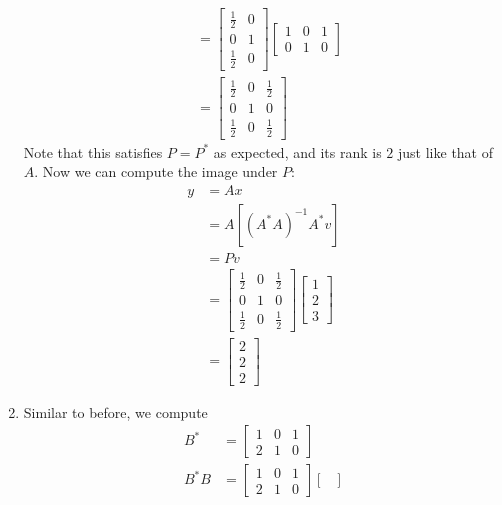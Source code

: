 \documentclass[12pt]{article}
\newenvironment{sol}[1][Solution]{\begin{trivlist}
		\item[\hskip \labelsep {\bfseries #1:}]}{\end{trivlist}}
\begin{document}
\begin{sol}
\begin{enumerate}[label=(\alph*)]
\begin{align*}
			&=\begin{bmatrix}
				\frac{1}{2} & 0\\
				0 & 1\\
				\frac{1}{2} & 0
			\end{bmatrix}
			\begin{bmatrix}
				1 & 0 & 1\\
				0 & 1 & 0
			\end{bmatrix}\\
			&=\begin{bmatrix}
				\frac{1}{2} & 0 & \frac{1}{2}\\
				0 & 1 & 0\\
				\frac{1}{2} & 0 & \frac{1}{2}
			\end{bmatrix}
		\end{align*}
		Note that this satisfies $P=P^*$ as expected, and its rank is $2$ just like that of $A$.
		Now we can compute the image under $P$:
		\begin{align*}
			y&=Ax\\
			&=A[(A^*A)^{-1}A^*v]\\
			&=Pv\\
			&=\begin{bmatrix}
				\frac{1}{2} & 0 & \frac{1}{2}\\
				0 & 1 & 0\\
				\frac{1}{2} & 0 & \frac{1}{2}
			\end{bmatrix}
			\begin{bmatrix}
				1\\
				2\\
				3
			\end{bmatrix}\\
			&=\begin{bmatrix}
				2\\
				2\\
				2
			\end{bmatrix}
		\end{align*}
		\item Similar to before, we compute
		\begin{align*}
			B^*&=\begin{bmatrix}
				1 & 0 & 1\\
				2 & 1 & 0
			\end{bmatrix}\\
			B^*B&=\begin{bmatrix}
				1 & 0 & 1\\
				2 & 1 & 0
			\end{bmatrix}
			\begin{bmatrix}

\end{bmatrix}
\end{align*}
\end{enumerate}
\end{sol}
\end{document}
